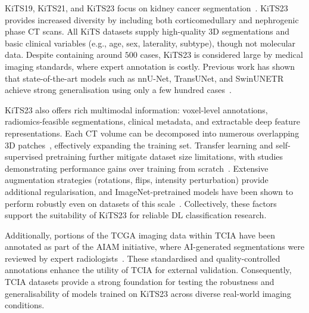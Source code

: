 \documentclass[final,british,a4paper,12pt]{phdthesis}
\begin{document}
KiTS19, KiTS21, and KiTS23 focus on kidney cancer segmentation~\cite{kitsIntro}. KiTS23 provides increased diversity by including both corticomedullary and nephrogenic phase CT scans. All KiTS datasets supply high-quality 3D segmentations and basic clinical variables (e.g., age, sex, laterality, subtype), though not molecular data. Despite containing around $500$ cases, KiTS23 is considered large by medical imaging standards, where expert annotation is costly. Previous work has shown that state-of-the-art models such as nnU-Net, TransUNet, and SwinUNETR achieve strong generalisation using only a few hundred cases~\cite{isensee2021nnu}.

KiTS23 also offers rich multimodal information: voxel-level annotations, radiomics-feasible segmentations, clinical metadata, and extractable deep feature representations. Each CT volume can be decomposed into numerous overlapping 3D patches~\cite{wolf2023self}, effectively expanding the training set. Transfer learning and self-supervised pretraining further mitigate dataset size limitations, with studies demonstrating performance gains over training from scratch~\cite{tajbakhsh2016convolutional,kim2022transfer,wolf2023self,azizi2023robust}. Extensive augmentation strategies (rotations, flips, intensity perturbation) provide additional regularisation, and ImageNet-pretrained models have been shown to perform robustly even on datasets of this scale~\cite{maccin2025kidneynext}. Collectively, these factors support the suitability of KiTS23 for reliable DL classification research.

Additionally, portions of the TCGA imaging data within TCIA have been annotated as part of the AIAM initiative, where AI-generated segmentations were reviewed by expert radiologists~\cite{van2023image}. These standardised and quality-controlled annotations enhance the utility of TCIA for external validation. Consequently, TCIA datasets provide a strong foundation for testing the robustness and generalisability of models trained on KiTS23 across diverse real-world imaging conditions.








\end{document}

